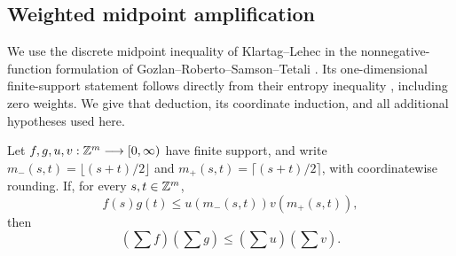 \subsection{Weighted midpoint amplification}

We use the discrete midpoint inequality of Klartag--Lehec
\cite{KlartagLehec2019} in the nonnegative-function formulation of
Gozlan--Roberto--Samson--Tetali \cite[Theorem~3]{GRST2019}.  Its
one-dimensional finite-support statement follows directly from their
entropy inequality \cite[Theorem~8, equation~(9)]{GRST2019}, including
zero weights.  We give that deduction, its coordinate induction, and
all additional hypotheses used here.

\begin{theorem}\label{thm:midpoint}
Let $f,g,u,v:\mathbb Z^m\longrightarrow[0,\infty)$ have finite support, and
write $m_-(s,t)=\lfloor(s+t)/2\rfloor$ and
$m_+(s,t)=\lceil(s+t)/2\rceil$, with coordinatewise rounding.
If, for every $s,t\in\mathbb Z^m$,
\[
 f(s)g(t)\leq u(m_-(s,t))v(m_+(s,t)),
\]
then
\[
 \left(\sum f\right)\left(\sum g\right)
 \leq\left(\sum u\right)\left(\sum v\right).
\]
\end{theorem}

